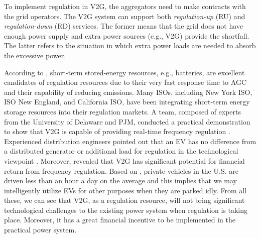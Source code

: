 \documentclass[journal]{IEEEtran}
\begin{document}
To implement regulation in V2G, the aggregators need to make contracts with the
grid operators.  The V2G system can support both \emph{regulation-up} (RU) and
\emph{regulation-down} (RD) services.  The former means that the grid does not have
enough power supply and extra power sources (e.g., V2G) provide the shortfall.
The latter refers to the situation in which extra power loads are needed to
absorb the excessive power. 


According to \cite{MISObook}, short-term stored-energy resources, e.g., batteries, are excellent candidates of regulation resources due to their very fast response time to AGC and their capability of reducing  emissions. Many ISOs, including New York ISO, ISO New England, and California ISO, have been integrating short-term energy storage resources into their regulation markets.
A team, composed of experts from the University of Delaware and PJM, conducted a practical demonstration to show that V2G is capable of providing real-time frequency regulation \cite{delaware}.
Experienced distribution engineers pointed out that an EV has no difference from a distributed generator or additional load for regulation in the technological viewpoint \cite{delaware}.
Moreover, \cite{financialreturn} revealed that V2G has significant potential for financial return from frequency regulation.
Based on \cite{traveltrends}, private vehicles in the U.S. are driven less than an hour a day on the average and this implies that we may intelligently utilize EVs for other purposes when they are parked idly. 
From all these, we can see that V2G, as a regulation resource, will not bring significant technological challenges to the existing power system when regulation is taking place. Moreover, it has a great financial incentive to be implemented in the practical power system.
\end{document}
